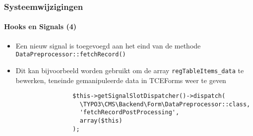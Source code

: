 
\begin{frame}[fragile]
	\frametitle{Systeemwijzigingen}
	\framesubtitle{Hooks en Signals (4)}

	\begin{itemize}

		\item Een nieuw signal is toegevoegd aan het eind van de methode \texttt{DataPreprocessor::fetchRecord()}
		\item Dit kan bijvoorbeeld worden gebruikt om de array \texttt{regTableItems\_data} te bewerken,
			teneinde gemanipuleerde data in TCEForms weer te geven

			\begin{lstlisting}
				$this->getSignalSlotDispatcher()->dispatch(
				  \TYPO3\CMS\Backend\Form\DataPreprocessor::class,
				  'fetchRecordPostProcessing',
				  array($this)
				);
			\end{lstlisting}

	\end{itemize}

\end{frame}


